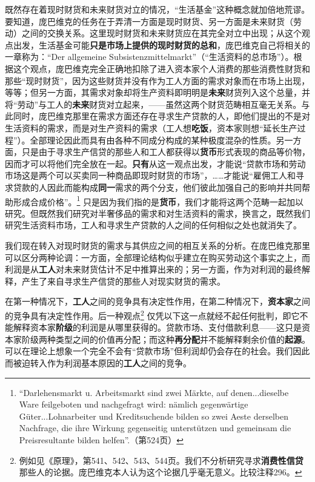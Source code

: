 \documentclass[fontset=fandol, a4paper, 12pt, openright]{ctexbook}
\begin{document}
既然存在着现时财货和未来财货对立的情况，“生活基金”这种概念就加倍地荒谬。要知道，庞巴维克的任务在于弄清一方面是现时财货、另一方面是未来财货（劳动）之间的交换关系。这里现时财货和未来财货应在其完全对立中出现；从这个观点出发，生活基金可能\textbf{只是市场上提供的现时财货的总和}，庞巴维克自己将相关的一章称为：“Der allgemeine Subsistenzmittelmarkt”（“生活资料的总市场”）。根据这个观点，庞巴维克完全正确地扣除了进入资本家个人消费的那些消费性财货和那些“现时财货”，因为这些财货并没有作为工人方面的需求对象而在市场上出现，等等；但另一方面，其需求对象却将生产资料即明明是\textbf{未来}财货列入这个总量，并将“劳动”与工人的\textbf{未来}财货对立起来，——虽然这两个财货范畴相互毫无关系。与此同时，庞巴维克那里在需求方面还存在寻求生产贷款的人，即他们提出的不是对生活资料的需求，而是对生产资料的需求（工人想\textbf{吃饭}，资本家则想“延长生产过程”）。全部理论因此而具有由各种不同成分构成的某种极度混杂的性质。另一方面，只是由于寻求生产信贷的那些人和工人都获得以\textbf{货币}形式表现的商品等价物，因而才可以将他们完全放在一起。\textbf{只有}从这一观点出发，才能说“贷款市场和劳动市场这是两个可以买卖同一种商品即现时财货的市场”，……才能说“雇佣工人和寻求贷款的人因此而能构成\textbf{同一}需求的两个分支，他们彼此加强自己的影响并共同帮助形成合成价格”。\footnote{``Darlehensmarkt u. Arbeitsmarkt sind zwei M\"{a}rkte, auf denen...dieselbe Ware feilgeboten und nachgefragt wird: n\"{a}mlich gegenw\"{a}rtige G\"{u}ter...Lohnarbeiter und Kreditsuchende bilden so zwei Aeste derselben Nachfrage, die ihre Wirkung gegenseitig unterst\"{u}tzen und gemeinsam die Preisresultante bilden helfen''.（第524页）} 只是因为我们指的是\textbf{货币}，我们才能将这两个范畴一起加以研究。但既然我们研究对半奢侈品的需求和对生活资料的需求，换言之，既然我们研究生活资料市场，工人和寻求生产贷款的人之间的任何相似之处也就消失了。

我们现在转入对现时财货的需求与其供应之间的相互关系的分析。在庞巴维克那里可以区分两种论调：一方面，全部理论结构似乎建立在购买劳动这个事实之上，而利润是从\textbf{工人}对未来财货估计不足中推算出来的；另一方面，作为对利润的最终解释，产生了来自寻求生产信贷的那些人对现实财货的需求。

在第一种情况下，\textbf{工人}之间的竞争具有决定性作用，在第二种情况下，\textbf{资本家}之间的竞争具有决定性作用。后一种观点\footnote{例如见《原理》，第541、542、543、544页。我们不分析研究寻求\textbf{消费性信贷}那些人的论据。庞巴维克本人认为这个论据几乎毫无意义。比较注释296。} 仅凭以下这一点就经不起任何批判，即它不能解释资本家\textbf{阶级}的利润是从哪里获得的。贷款市场、支付借款利息——这只是资本家阶级两种类型之间的价值再分配；而这种\textbf{再分配}并不能解释剩余价值的\textbf{起源}。可以在理论上想象一个完全不会有“贷款市场”但利润却仍会存在的社会。我们因此而被迫转入作为利润基本原因的\textbf{工人}之间的竞争。
\end{document}
